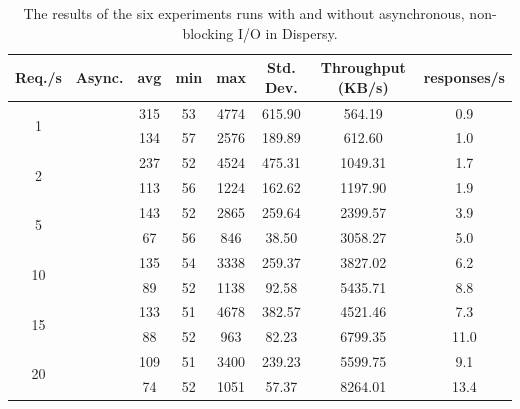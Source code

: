 \begin{table}[!h]
	\centering
	\caption{The results of the six experiments runs with and without asynchronous, non-blocking I/O in Dispersy.}
	\label{table:responsiveness_tribler_load}
	\begin{tabular}{|c|c|c|c|c|c|c|c|}
		\hline
		Req./s              & Async. & avg & min & max  & Std. Dev. & Throughput (KB/s) & responses/s \\ \hline
		\multirow{2}{*}{1}  & \xmark      & 315 & 53  & 4774 & 615.90    & 564.19            & 0.9         \\ \cline{2-8} 
		& \cmark      & 134 & 57  & 2576 & 189.89    & 612.60            & 1.0         \\ \hline
		\multirow{2}{*}{2}  & \xmark       & 237 & 52  & 4524 & 475.31    & 1049.31           & 1.7         \\ \cline{2-8} 
		& \cmark      & 113 & 56  & 1224 & 162.62    & 1197.90           & 1.9         \\ \hline
		\multirow{2}{*}{5}  & \xmark       & 143 & 52  & 2865 & 259.64    & 2399.57           & 3.9         \\ \cline{2-8} 
		& \cmark      & 67  & 56  & 846  & 38.50     & 3058.27           & 5.0         \\ \hline
		\multirow{2}{*}{10} & \xmark       & 135 & 54  & 3338 & 259.37    & 3827.02           & 6.2         \\ \cline{2-8} 
		& \cmark      & 89  & 52  & 1138 & 92.58     & 5435.71           & 8.8         \\ \hline
		\multirow{2}{*}{15} & \xmark       & 133 & 51  & 4678 & 382.57    & 4521.46           & 7.3         \\ \cline{2-8} 
		& \cmark      & 88  & 52  & 963  & 82.23     & 6799.35           & 11.0        \\ \hline
		\multirow{2}{*}{20} & \xmark       & 109 & 51  & 3400 & 239.23    & 5599.75           & 9.1         \\ \cline{2-8} 
		& \cmark      & 74  & 52  & 1051 & 57.37     & 8264.01           & 13.4        \\ \hline
	\end{tabular}
\end{table}

